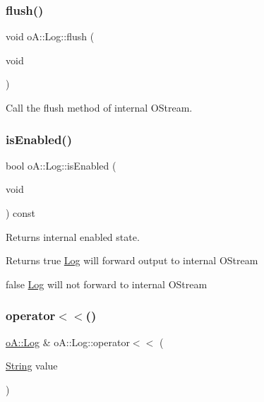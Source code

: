 \subsubsection{\texorpdfstring{flush()}{flush()}}
{\footnotesize\ttfamily void o\+A\+::\+Log\+::flush (\begin{DoxyParamCaption}\item[{void}]{ }\end{DoxyParamCaption})\hspace{0.3cm}{\ttfamily [noexcept]}}



Call the flush method of internal O\+Stream. 

\mbox{\label{classo_a_1_1_log_ada21589725c48f82d05893e5936522ea}} 
\subsubsection{\texorpdfstring{is\+Enabled()}{isEnabled()}}
{\footnotesize\ttfamily bool o\+A\+::\+Log\+::is\+Enabled (\begin{DoxyParamCaption}\item[{void}]{ }\end{DoxyParamCaption}) const\hspace{0.3cm}{\ttfamily [noexcept]}}



Returns internal enabled state. 

\begin{DoxyReturn}{Returns}
true \mbox{\hyperlink{classo_a_1_1_log}{Log}} will forward output to internal O\+Stream 

false \mbox{\hyperlink{classo_a_1_1_log}{Log}} will not forward to internal O\+Stream 
\end{DoxyReturn}
\mbox{\label{classo_a_1_1_log_acfa81696d9db53900bb4d03f278024ee}} 
\subsubsection{\texorpdfstring{operator$<$$<$()}{operator<<()}\hspace{0.1cm}{\footnotesize\ttfamily [1/9]}}
{\footnotesize\ttfamily \mbox{\hyperlink{classo_a_1_1_log}{o\+A\+::\+Log}} \& o\+A\+::\+Log\+::operator$<$$<$ (\begin{DoxyParamCaption}\item[{\mbox{\hyperlink{classo_a_1_1_string}{String}}}]{value }\end{DoxyParamCaption})}

